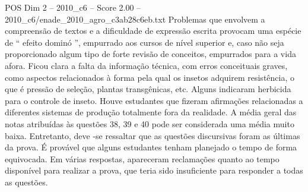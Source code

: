 \begin{textsample}{POS Dim 2 – 2010\_c6 – Score 2.00 – 2010\_c6/enade\_2010\_agro\_c3ab28c6eb.txt}
Problemas que envolvem a compreensão de textos e a dificuldade de expressão escrita provocam uma espécie de “ efeito dominó ”, empurrado aos cursos de nível superior e, caso não seja proporcionado algum tipo de forte revisão de conceitos, empurrados para a vida afora.
Ficou clara a falta da informação técnica, com erros conceituais graves, como aspectos relacionados à forma pela qual os insetos adquirem resistência, o que é pressão de seleção, plantas transgênicas, etc.
Alguns indicaram herbicida para o controle de inseto.
Houve estudantes que fizeram afirmações relacionadas a diferentes sistemas de produção totalmente fora da realidade.
A média geral das notas atribuídas às questões 38, 39 e 40 pode ser considerada uma média muito baixa.
Entretanto, deve -se ressaltar que as questões discursivas foram as últimas da prova.
É provável que alguns estudantes tenham planejado o tempo de forma equivocada.
Em várias respostas, apareceram reclamações quanto ao tempo disponível para realizar a prova, que teria sido insuficiente para responder a todas as questões.

\end{textsample}
